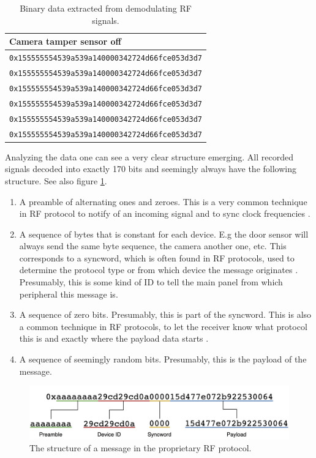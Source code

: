 \begin{table}[!p]
\begin{tabularx}{\textwidth}{l}
        \textbf{Camera tamper sensor off} \\ \hline
        \texttt{0x155555554539a539a140000342724d66fce053d3d7} \\
        \texttt{0x155555554539a539a140000342724d66fce053d3d7} \\
        \texttt{0x155555554539a539a140000342724d66fce053d3d7} \\
        \texttt{0x155555554539a539a140000342724d66fce053d3d7} \\
        \texttt{0x155555554539a539a140000342724d66fce053d3d7} \\
        \texttt{0x155555554539a539a140000342724d66fce053d3d7} \\
        \hline
    \end{tabularx}
    \caption{Binary data extracted from demodulating RF signals.}
    \label{tb:demodulated-data}
\end{table}
Analyzing the data one can see a very clear structure emerging. All recorded signals decoded into exactly 170 bits and seemingly always have the following structure. See also figure \ref{fig:rf-message-structure}.
\begin{enumerate}
    \item A preamble of alternating ones and zeroes. This is a very common technique in RF protocol to notify of an incoming signal and to sync clock frequencies \cite{hacking-the-iot-talk}.
    \item A sequence of bytes that is constant for each device. E.g the door sensor will always send the same byte sequence, the camera another one, etc. This corresponds to a syncword, which is often found in RF protocols, used to determine the protocol type or from which device the message originates \cite{hacking-the-iot-talk}. Presumably, this is some kind of ID to tell the main panel from which peripheral this message is.
    \item A sequence of zero bits. Presumably, this is part of the syncword. This is also a common technique in RF protocols, to let the receiver know what protocol this is and exactly where the payload data starts \cite{hacking-the-iot-talk}.
    \item A sequence of seemingly random bits. Presumably, this is the payload of the message.
\end{enumerate}
\begin{figure}[!ht]
    \centering
    \includegraphics[width=\textwidth]{images/6-pentesting/rf-message-structure.png}
    \caption{The structure of a message in the proprietary RF protocol.}
    \label{fig:rf-message-structure}
\end{figure}
